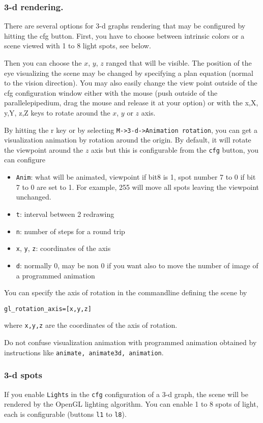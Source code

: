 \documentclass{article}
\begin{document}
\subsubsection{3-d rendering.}
There are several options for 3-d graphs rendering that may be
configured by hitting the cfg button. First, you have to choose
between intrinsic colors or a scene viewed with 1 to 8 light spots, 
see below.

Then you can choose the $x$, $y$, $z$ ranged that will be visible.
The position of the eye visualizing the scene may be changed by
specifying a plan equation (normal to the vision direction). You
may also easily change the view point outside of
the cfg configuration window either with the
mouse (push outside of the parallelepipedium, drag the mouse
and release it at your option) or with the x,X, y,Y, z,Z keys to
rotate around the $x$, $y$ or $z$ axis. 

By hitting the r key or by selecting 
\verb|M->3-d->Animation rotation|,
you can get a visualization animation by rotation around the
origin. By default, it will rotate the viewpoint around the $z$ axis
but this is configurable from the \verb|cfg| button, you can configure
\begin{itemize}
\item \verb|Anim|: what will be animated, viewpoint if bit8 is 1, 
spot number 7 to 0 if bit 7 to 0 are set to 1. For example, 255 will
move all spots leaving the viewpoint unchanged.
\item \verb|t|: interval between 2 redrawing
\item \verb|n|: number of steps for a round trip
\item \verb|x|, \verb|y|, \verb|z|: coordinates of the axis
\item \verb|d|: normally 0, may be non 0 if you want also to move the
number of image of a programmed animation
\end{itemize}
You can specify the axis of rotation in the commandline defining the
scene by 
\begin{center}
\verb|gl_rotation_axis=[x,y,z]| 
\end{center}
where \verb|x,y,z|
are the coordinates of the axis of rotation.

Do not confuse visualization animation with programmed animation
obtained by instructions like \verb|animate, animate3d, animation|.

\subsubsection{3-d spots}
If you enable \verb|Lights| in the \verb|cfg| configuration of a 3-d
graph, the scene will be rendered by the OpenGL lighting
algorithm. You can enable 1 to 8 spots of light, each is configurable
(buttons \verb|l1| to \verb|l8|). 
\end{document}
